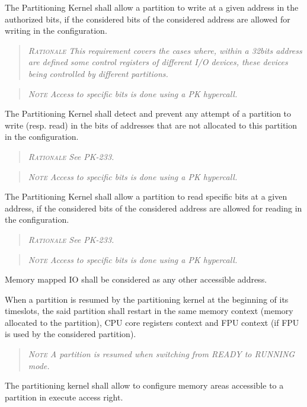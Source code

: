 The Partitioning Kernel shall allow a partition to write at a given address in the authorized bits, if the considered bits of the considered address are allowed for writing in the configuration.
\begin{quote}\it
\textsc{Rationale}
This requirement covers the cases where, within a 32bits address are defined some control registers of different I/O devices, these devices being controlled by different partitions.
\end{quote}
\begin{quote}\it
\textsc{Note}
Access to specific bits is done using a PK hypercall.
\end{quote}

The Partitioning Kernel shall detect and prevent any attempt of a partition to write (resp. read) in the bits of addresses that are not allocated to this partition in the configuration.
\begin{quote}\it
\textsc{Rationale}
See PK-233.
\end{quote}
\begin{quote}\it
\textsc{Note}
Access to specific bits is done using a PK hypercall.
\end{quote}

The Partitioning Kernel shall allow a partition to read specific bits at a given address, if the considered bits of the considered address are allowed for reading in the configuration.
\begin{quote}\it
\textsc{Rationale}
See PK-233.
\end{quote}
\begin{quote}\it
\textsc{Note}
Access to specific bits is done using a PK hypercall.
\end{quote}

Memory mapped IO shall be considered as any other accessible address.

When a partition is resumed by the partitioning kernel at the beginning of its timeslots, the said partition shall restart in the same memory context (memory allocated to the partition), CPU core registers context and FPU context (if FPU is used by the considered partition).
\begin{quote}\it
\textsc{Note}
A partition is resumed when switching from READY to RUNNING mode.
\end{quote}

The partitioning kernel shall allow to configure memory areas accessible to a partition in execute access right.

